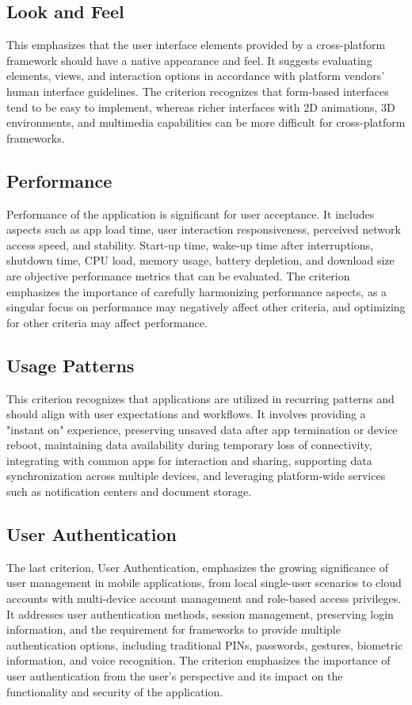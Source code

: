 \subsection{Look and Feel}
This emphasizes that the user interface elements provided by a cross-platform framework should have a native appearance and feel. It suggests evaluating elements, views, and interaction options in accordance with platform vendors' human interface guidelines. The criterion recognizes that form-based interfaces tend to be easy to implement, whereas richer interfaces with 2D animations, 3D environments, and multimedia capabilities can be more difficult for cross-platform frameworks.

\subsection{Performance}
Performance of the application is significant for user acceptance. It includes aspects such as app load time, user interaction responsiveness, perceived network access speed, and stability. Start-up time, wake-up time after interruptions, shutdown time, CPU load, memory usage, battery depletion, and download size are objective performance metrics that can be evaluated. The criterion emphasizes the importance of carefully harmonizing performance aspects, as a singular focus on performance may negatively affect other criteria, and optimizing for other criteria may affect performance.

\subsection{Usage Patterns}
This criterion recognizes that applications are utilized in recurring patterns and should align with user expectations and workflows. It involves providing a "instant on" experience, preserving unsaved data after app termination or device reboot, maintaining data availability during temporary loss of connectivity, integrating with common apps for interaction and sharing, supporting data synchronization across multiple devices, and leveraging platform-wide services such as notification centers and document storage.

\subsection{User Authentication}
The last criterion, User Authentication, emphasizes the growing significance of user management in mobile applications, from local single-user scenarios to cloud accounts with multi-device account management and role-based access privileges. It addresses user authentication methods, session management, preserving login information, and the requirement for frameworks to provide multiple authentication options, including traditional PINs, passwords, gestures, biometric information, and voice recognition. The criterion emphasizes the importance of user authentication from the user's perspective and its impact on the functionality and security of the application.

